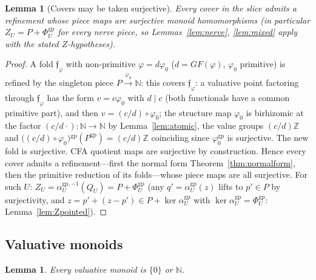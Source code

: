 \documentclass[11pt]{article}
\newtheorem{lemma}[theorem]{Lemma}
\theoremstyle{definition}
\newcommand{\gp}{\mathrm{gp}}
\newcommand{\Z}{\mathbb{Z}}
\begin{document}
\begin{lemma}[Covers may be taken surjective]\label{lem:surj}
Every cover in the slice admits a refinement whose piece maps are
surjective monoid homomorphisms \textup{(}in particular
$Z_U=P+\Phi_U^{\gp}$ for every nerve piece, so
Lemmas~\ref{lem:nerve}, \ref{lem:mixed} apply with the stated
$Z$-hypotheses\textup{)}.
\end{lemma}

\begin{proof}
A fold $\mathfrak f_\varphi$ with non-primitive
$\varphi=d\varphi_0$ \textup{(}$d={GF}(\varphi)$, $\varphi_0$
primitive\textup{)} is refined by the singleton piece
$P\xrightarrow{\varphi_0}\mathbb N$: this covers
$\mathfrak f_\varphi$: a valuative point factoring through
$\mathfrak f_\varphi$ has the form $v=c\varphi_0$ with
$d\mid c$ (both functionals have a common primitive part), and
then $v=(c/d)\circ\varphi_0$; the structure map $\varphi_0$ is
birhizomic at the factor $(c/d\cdot):\mathbb N\to\mathbb N$ by
Lemma~\ref{lem:atomic}, the value groups $(c/d)\Z$ and
$\bigl((c/d)\circ\varphi_0\bigr){}^{\gp}(P^{\gp})=(c/d)\Z$
coinciding since $\varphi_0^{\gp}$ is surjective. The new fold
is surjective. CFA quotient
maps are surjective by construction. Hence every cover admits a
refinement---first the normal form
Theorem~\ref{thm:normalform}, then the primitive reduction of
its folds---whose piece maps are all surjective. For such $U$:
$Z_U=\alpha_U^{\gp,-1}(Q_U)=P+\Phi_U^{\gp}$ \textup{(}any
$q'=\alpha_U^{\gp}(z)$ lifts to $p'\in P$ by surjectivity, and
$z=p'+(z-p')\in P+\ker\alpha_U^{\gp}$ with
$\ker\alpha_U^{\gp}=\Phi_U^{\gp}$:
Lemma~\ref{lem:Zpointed}\textup{)}.
\end{proof}

\subsection{Valuative monoids}

\begin{lemma}\label{lem:N}
Every valuative monoid is $\{0\}$ or $\mathbb N$.
\end{lemma}
\end{document}

